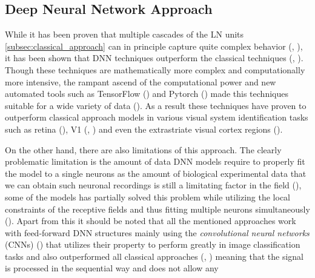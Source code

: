 \subsection{Deep Neural Network Approach}
\label{subsec:deep_learning_approach}
While it has been proven that multiple cascades of the LN units \ref{subsec:classical_approach} can in principle capture quite complex behavior (\citet{cybenko1989approximation}, \citet{HORNIK1991251}), it has been shown that DNN techniques outperform the classical techniques (\citet{MAL-006}, \citet{Kriegeskorte2015dnn}). Though these techniques are mathematically more complex and computationally more intensive, the rampant ascend of the computational power and new automated tools such as TensorFlow (\citet{TensorFlow}) and Pytorch (\citet{paszke2017automatic}) made this techniques suitable for a wide variety of data (\citet{lecun2015deep}). As a result these techniques have proven to outperform classical approach models in various visual system identification tasks such as retina (\citet{Maheswaranathan340943}), V1 (\citet{cadena2019conv}, \citet{kindel2017usingdeeplearningreveal}) and even the extrastriate visual cortex regions (\citet{zareh2024deep}). 

On the other hand, there are also limitations of this approach. The clearly problematic limitation is the amount of data DNN models require to properly fit the model to a single neurons as the amount of biological experimental data that we can obtain such neuronal recordings is still a limitating factor in the field (\citet{zhang2019convolutional}), some of the models has partially solved this problem while utilizing the local constraints of the receptive fields and thus fitting multiple neurons simultaneously (\citet{antolik2016local}). Apart from this it should be noted that all the mentioned approaches work with feed-forward DNN structures mainly using the \emph{convolutional neural networks} (CNNs) (\citet{NIPS2012_c399862d}) that utilizes their property to perform greatly in image classification tasks and also outperformed all classical approaches (\citet{zhang2019convolutional}, \citet{cadena2019conv}) meaning that the signal is processed in the sequential way and does not allow any 